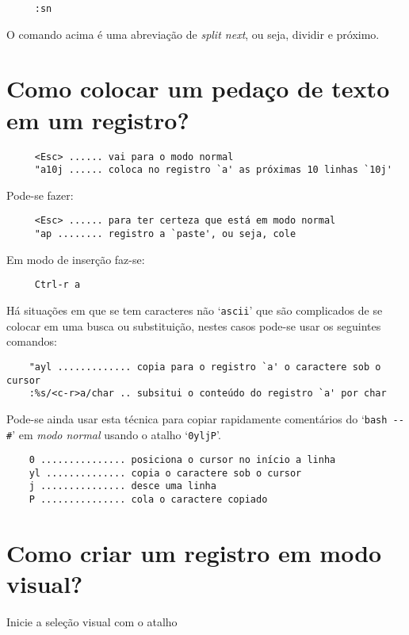 \begin{verbatim}
     :sn
\end{verbatim}

O comando acima é uma abreviação de {\em split next}, ou seja, dividir e próximo.

\section{Como colocar um pedaço de texto em um registro?}
\label{Como colocar um pedaço de texto em um registro?}

\begin{verbatim}
     <Esc> ...... vai para o modo normal
     "a10j ...... coloca no registro `a' as próximas 10 linhas `10j'
\end{verbatim}

Pode-se fazer:

\begin{verbatim}
     <Esc> ...... para ter certeza que está em modo normal
     "ap ........ registro a `paste', ou seja, cole
\end{verbatim}

Em modo de inserção faz-se:

\begin{verbatim}
     Ctrl-r a
\end{verbatim}

{\Large {}} Há situações em que se tem caracteres não `{\tt ascii}' que
são complicados de se colocar em uma busca ou substituição, nestes casos
pode-se usar os seguintes comandos:

\begin{verbatim}
    "ayl ............. copia para o registro `a' o caractere sob o cursor
    :%s/<c-r>a/char .. subsitui o conteúdo do registro `a' por char
\end{verbatim}

Pode-se ainda usar esta técnica para copiar rapidamente comentários 
do `\verb|bash -- #|' em {\em modo normal} usando o atalho `{\tt 0yljP}'.

\begin{verbatim}
    0 ............... posiciona o cursor no início a linha
    yl .............. copia o caractere sob o cursor
    j ............... desce uma linha
    P ............... cola o caractere copiado
\end{verbatim}

\section{Como criar um registro em modo visual?}
\label{Como criar um registro em modo visual?}
Inicie a seleção visual com o atalho

